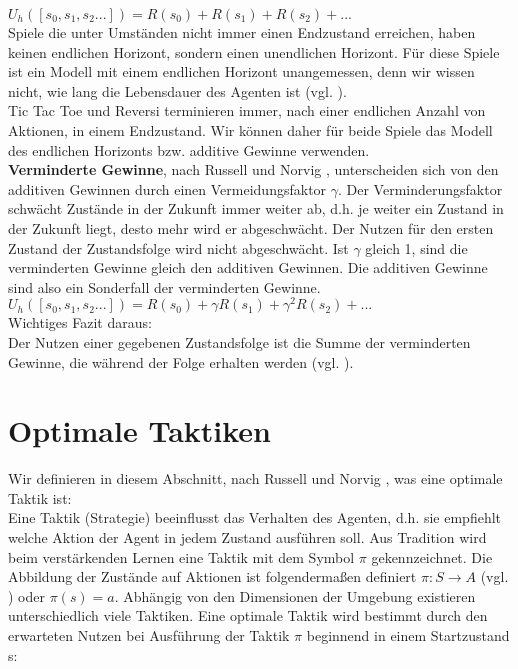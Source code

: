 $U_h([s_0, s_1, s_2 ...]) = R(s_0) + R(s_1) + R(s_2) + ...$ \\

Spiele die unter Umständen nicht immer einen Endzustand erreichen, haben keinen endlichen Horizont, sondern einen unendlichen Horizont. Für diese Spiele ist ein Modell mit einem endlichen Horizont unangemessen, denn wir wissen nicht, wie lang die Lebensdauer des Agenten ist (vgl. \cite[250]{KLM96}). \\

Tic Tac Toe und Reversi terminieren immer, nach einer endlichen Anzahl von Aktionen, in einem Endzustand. Wir können daher für beide Spiele das Modell des endlichen Horizonts bzw. additive Gewinne verwenden.\\

\textbf{Verminderte Gewinne}, nach Russell und Norvig \cite[756]{Russell}, unterscheiden sich von den additiven Gewinnen durch einen Vermeidungsfaktor $\gamma$. Der Verminderungsfaktor schwächt Zustände in der Zukunft immer weiter ab, d.h. je weiter ein Zustand in der Zukunft liegt, desto mehr wird er abgeschwächt. Der Nutzen für den ersten Zustand der Zustandsfolge wird nicht abgeschwächt. Ist $\gamma$ gleich 1, sind die verminderten Gewinne gleich den additiven Gewinnen. Die additiven Gewinne sind also ein Sonderfall der verminderten Gewinne.\\

$U_h([s_0, s_1, s_2 ...]) = R(s_0) + \gamma R(s_1) + \gamma^2 R(s_2) + ...$\\

Wichtiges Fazit daraus: \\
Der Nutzen einer gegebenen Zustandsfolge ist die Summe der verminderten Gewinne, die während der Folge erhalten werden (vgl. \cite[757]{Russell}). \\

\section{Optimale Taktiken}
\label{sec:Optimale Taktiken}
Wir definieren in diesem Abschnitt, nach Russell und Norvig \cite[757\psq]{Russell}, was eine optimale Taktik ist: \\
Eine Taktik (Strategie) beeinflusst das Verhalten des Agenten, d.h. sie empfiehlt welche Aktion der Agent in jedem Zustand ausführen soll. Aus Tradition wird beim verstärkenden Lernen eine Taktik mit dem Symbol $\pi$ gekennzeichnet. Die Abbildung der Zustände auf Aktionen ist folgendermaßen definiert $\pi : S \rightarrow A$ (vgl. \cite[290]{Ertel}) oder $\pi(s) = a$. Abhängig von den Dimensionen der Umgebung existieren unterschiedlich viele Taktiken. Eine optimale Taktik wird bestimmt durch den erwarteten Nutzen bei Ausführung der Taktik $\pi$ beginnend in einem Startzustand s:\\

